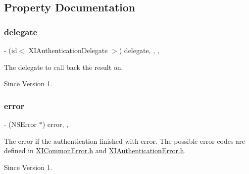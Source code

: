 \subsection{Property Documentation}
\hypertarget{class_x_i_authentication_a7daae4919be8aa935e600b1ee959f70c}{}\label{class_x_i_authentication_a7daae4919be8aa935e600b1ee959f70c} 
\subsubsection{\texorpdfstring{delegate}{delegate}}
{\footnotesize\ttfamily -\/ (id$<$ X\+I\+Authentication\+Delegate $>$) delegate\hspace{0.3cm}{\ttfamily [read]}, {\ttfamily [write]}, {\ttfamily [nonatomic]}, {\ttfamily [weak]}}



The delegate to call back the result on. 

\begin{DoxySince}{Since}
Version 1. 
\end{DoxySince}
\hypertarget{class_x_i_authentication_a57d9e97d981ae0ba9c9bacf431989596}{}\label{class_x_i_authentication_a57d9e97d981ae0ba9c9bacf431989596} 
\subsubsection{\texorpdfstring{error}{error}}
{\footnotesize\ttfamily -\/ (N\+S\+Error $\ast$) error\hspace{0.3cm}{\ttfamily [read]}, {\ttfamily [nonatomic]}, {\ttfamily [assign]}}



The error if the authentication finished with error. The possible error codes are defined in \hyperlink{_x_i_common_error_8h}{X\+I\+Common\+Error.\+h} and \hyperlink{_x_i_authentication_error_8h}{X\+I\+Authentication\+Error.\+h}. 

\begin{DoxySince}{Since}
Version 1. 
\end{DoxySince}
\hypertarget{class_x_i_authentication_a59528547df840ad2a9708b9a30af4540}{}\label{class_x_i_authentication_a59528547df840ad2a9708b9a30af4540} 
